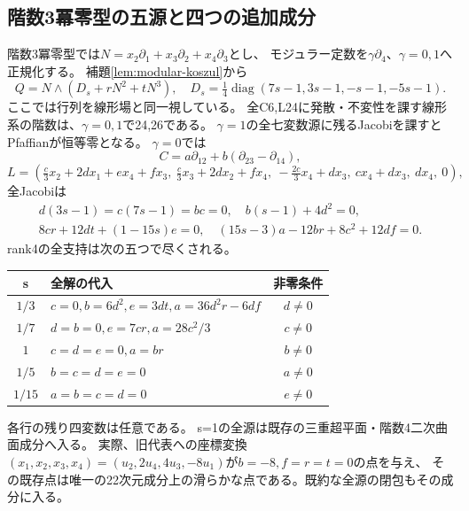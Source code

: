 \documentclass[a4paper,11pt]{ltjsarticle}
\theoremstyle{definition}
\begin{document}
\subsection{階数3冪零型の五源と四つの追加成分}
階数3冪零型では$N=x_2\partial_1+x_3\partial_2+x_4\partial_3$とし、
モジュラー定数を$\gamma\partial_4$、$\gamma=0,1$へ正規化する。
補題\ref{lem:modular-koszul}から
\[
 Q=N\wedge(D_s+rN^2+tN^3),\quad
 D_s=\tfrac14\operatorname{diag}(7s-1,3s-1,-s-1,-5s-1).
\]
ここでは行列を線形場と同一視している。
全C6,L24に発散・不変性を課す線形系の階数は、$\gamma=0,1$で24,26である。
$\gamma=1$の全七変数源に残るJacobiを課すとPfaffianが恒等零となる。
$\gamma=0$では
\[
 C=a\partial_{12}+b(\partial_{23}-\partial_{14}),
\]
\[
 L=\left(\tfrac c3x_2+2dx_1+ex_4+fx_3,\
 \tfrac c3x_3+2dx_2+fx_4,\ -\tfrac{2c}3x_4+dx_3,\
 cx_4+dx_3,\ dx_4,\ 0\right),
\]
全Jacobiは
\[
\begin{gathered}
 d(3s-1)=c(7s-1)=bc=0,\quad b(s-1)+4d^2=0,\\
 8cr+12dt+(1-15s)e=0,\quad(15s-3)a-12br+8c^2+12df=0.
\end{gathered}
\]
rank4の全支持は次の五つで尽くされる。
\begin{center}\small
\begin{tabular}{c|l|c}
s&全解の代入&非零条件\\\hline
$1/3$&$c=0,b=6d^2,e=3dt,a=36d^2r-6df$&$d\ne0$\\
$1/7$&$d=b=0,e=7cr,a=28c^2/3$&$c\ne0$\\
$1$&$c=d=e=0,a=br$&$b\ne0$\\
$1/5$&$b=c=d=e=0$&$a\ne0$\\
$1/15$&$a=b=c=d=0$&$e\ne0$
\end{tabular}
\end{center}
各行の残り四変数は任意である。
s=1の全源は既存の三重超平面・階数4二次曲面成分へ入る。
実際、旧代表への座標変換
$(x_1,x_2,x_3,x_4)=(u_2,2u_4,4u_3,-8u_1)$が$b=-8,f=r=t=0$の点を与え、
その既存点は唯一の22次元成分上の滑らかな点である。既約な全源の閉包もその成分に入る。
\end{document}
